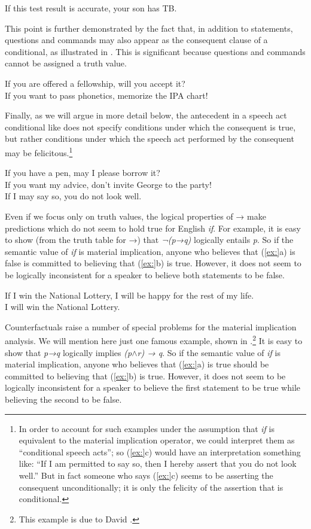 \ea
If this test result is accurate, your son has TB.
\z


This point is further demonstrated by the fact that, in addition to statements, questions and commands may also appear as the consequent clause of a conditional, as illustrated in . This is significant because questions and commands cannot be assigned a truth value.


\ea
\ea If you are offered a fellowship, will you accept it?\\
\ex If you want to pass phonetics, memorize the IPA chart!
                       \z
\z


Finally, as we will argue in more detail below, the antecedent in a speech act conditional like  does not specify conditions under which the consequent is true, but rather conditions under which the speech act performed by the consequent may be felicitous.\footnote{In order to account for such examples under the assumption that \textit{if} is equivalent to the material implication operator, we could interpret them as “conditional speech acts”; so (\ref{ex:}c) would have an interpretation something like: “If I am permitted to say so, then I hereby assert that you do not look well.” But in fact someone who says (\ref{ex:}c) seems to be asserting the consequent unconditionally; it is only the felicity of the assertion that is conditional.}


\ea
\ea If you have a pen, may I please borrow it?\\
\ex If you want my advice, don’t invite George to the party!\\
\ex If I may say so, you do not look well.
                       \z
\z


Even if we focus only on truth values, the logical properties of → make predictions which do not seem to hold true for English \textit{if}. For example, it is easy to show (from the truth table for →) that \textit{¬(p→q)} logically entails \textit{p}. So if the semantic value of \textit{if} is material implication, anyone who believes that (\ref{ex:}a) is false is committed to believing that (\ref{ex:}b) is true. However, it does not seem to be logically inconsistent for a speaker to believe both statements to be false.


\ea
\ea If I win the National Lottery, I will be happy for the rest of my life.\\
\ex I will win the National Lottery.
                       \z
\z


Counterfactuals raise a number of special problems for the material implication analysis. We will mention here just one famous example, shown in .\footnote{This example is due to David \citet{Lewis1973a}.} It is easy to show that \textit{p→q} logically implies \textit{(p}$\wedge$\textit{r) → q}. So if the semantic value of \textit{if} is material implication, anyone who believes that (\ref{ex:}a) is true should be committed to believing that (\ref{ex:}b) is true. However, it does not seem to be logically inconsistent for a speaker to believe the first statement to be true while believing the second to be false.


